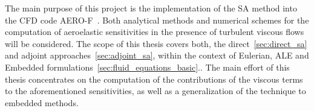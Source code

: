 The main purpose of this project is the implementation of the \ac{SA} method into the \ac{CFD} code AERO-F~\cite{Aerof}.
Both analytical methods and numerical schemes for the computation of
aeroelastic sensitivities in the presence of turbulent viscous flows will be considered.
The scope of this thesis covers both, the direct~\ref{sec:direct_sa} and adjoint approaches~\ref{sec:adjoint_sa}, within the context of Eulerian, \ac{ALE} and Embedded formulations~\ref{sec:fluid_equations_basic}..
The main effort of this thesis concentrates on the computation of the contributions of the viscous terms to the aforementioned sensitivities, as well as a generalization of the technique to embedded methods.